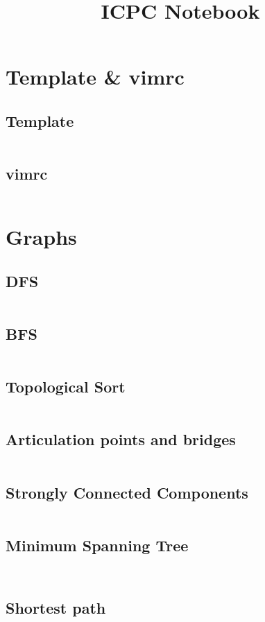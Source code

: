 \documentclass[a4paper, 10pt, twocolumn, landscape]{article}
\title{ICPC Notebook}
\begin{document}
\pagestyle{fancy}

\setlength{\columnseprule}{1pt}

\setcounter{tocdepth}{1}
\tableofcontents

\section{Template \& vimrc}
\subsection{Template}
\inputminted{cpp}{template.cpp}
\subsection{vimrc}
\inputminted{vim}{vimrc}

\section{Graphs}
\subsection{DFS}
\inputminted{cpp}{graphs/dfs.cpp}
\subsection{BFS}
\inputminted{cpp}{graphs/bfs.cpp}
\subsection{Topological Sort}
\inputminted{cpp}{graphs/kahn.cpp}
\subsection{Articulation points and bridges}
\inputminted{cpp}{graphs/articulation.cpp}
\subsection{Strongly Connected Components}
\inputminted{cpp}{graphs/kosaraju.cpp}
\subsection{Minimum Spanning Tree}
\inputminted{cpp}{graphs/kruskal.cpp}
\inputminted{cpp}{graphs/prim.cpp}
\subsection{Shortest path}
\inputminted{cpp}{graphs/dijkstra.cpp}
\inputminted{cpp}{graphs/bellman-ford.cpp}
\inputminted{cpp}{graphs/spfa.cpp}
\inputminted{cpp}{graphs/floyd-warshall.cpp}
\end{document}
